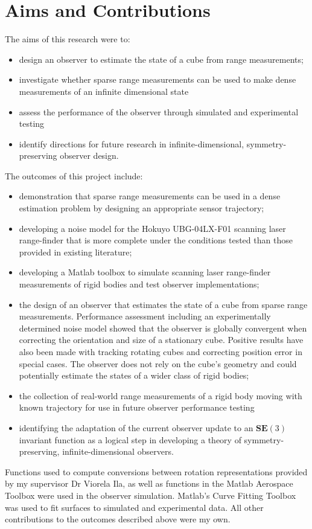 \chapter*{Aims and Contributions}

The aims of this research were to:
\begin{itemize}
\item design an observer to estimate the state of a cube from range measurements;
\item investigate whether sparse range measurements can be used to make dense measurements of an infinite dimensional state
\item assess the performance of the observer through simulated and experimental testing 
\item identify directions for future research in infinite-dimensional, symmetry-preserving observer design.
\end{itemize}

The outcomes of this project include:
\begin{itemize}
\item demonstration that sparse range measurements can be used in a dense estimation problem by designing an appropriate sensor trajectory;
\item developing a noise model for the Hokuyo UBG-04LX-F01 scanning laser range-finder that is more complete under the conditions tested than those provided in existing literature;
\item developing a Matlab toolbox to simulate scanning laser range-finder measurements of rigid bodies and test observer implementations;
\item the design of an observer that estimates the state of a cube from sparse range measurements. Performance assessment including an experimentally determined noise model showed that the observer is globally convergent when correcting the orientation and size of a stationary cube. Positive results have also been made with tracking rotating cubes and correcting position error in special cases. The observer does not rely on the cube's geometry and could potentially estimate the states of a wider class of rigid bodies;
\item the collection of real-world range measurements of a rigid body moving with known trajectory for use in future observer performance testing
\item identifying the adaptation of the current observer update to an $\mathbf{SE}(3)$ invariant function as a logical step in developing a theory of symmetry-preserving, infinite-dimensional observers.
\end{itemize}

Functions used to compute conversions between rotation representations provided by my supervisor Dr Viorela Ila, as well as functions in the Matlab Aerospace Toolbox were used in the observer simulation. Matlab's Curve Fitting Toolbox was used to fit surfaces to simulated and experimental data.
All other contributions to the outcomes described above were my own.